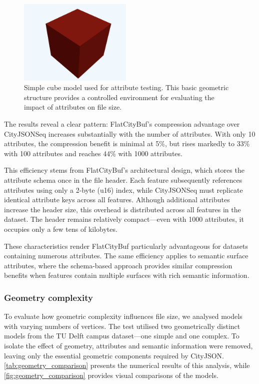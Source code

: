 \begin{figure}[htbp]
  \centering
  \includegraphics[width=0.48\textwidth]{figs/result_analysis/cube.png}
  \caption{Simple cube model used for attribute testing. This basic geometric structure provides a controlled environment for evaluating the impact of attributes on file size.}
  \label{fig:simple_cube}
\end{figure}

The results reveal a clear pattern: FlatCityBuf's compression advantage over CityJSONSeq increases substantially with the number of attributes. With only 10 attributes, the compression benefit is minimal at 5\%, but rises markedly to 33\% with 100 attributes and reaches 44\% with 1000 attributes.

This efficiency stems from FlatCityBuf's architectural design, which stores the attribute schema once in the file header. Each feature subsequently references attributes using only a 2-byte (u16) index, while CityJSONSeq must replicate identical attribute keys across all features. Although additional attributes increase the header size, this overhead is distributed across all features in the dataset. The header remains relatively compact—even with 1000 attributes, it occupies only a few tens of kilobytes.

These characteristics render FlatCityBuf particularly advantageous for datasets containing numerous attributes. The same efficiency applies to semantic surface attributes, where the schema-based approach provides similar compression benefits when features contain multiple surfaces with rich semantic information.

\subsubsection{Geometry complexity}
\label{result:overview:analysis_of_file_size_results:geometric_complexity}

To evaluate how geometric complexity influences file size, we analysed models with varying numbers of vertices. The test utilised two geometrically distinct models from the TU Delft campus dataset—one simple and one complex. To isolate the effect of geometry, attributes and semantic information were removed, leaving only the essential geometric components required by CityJSON. \autoref{tab:geometry_comparison} presents the numerical results of this analysis, while \autoref{fig:geometry_comparison} provides visual comparisons of the models.

